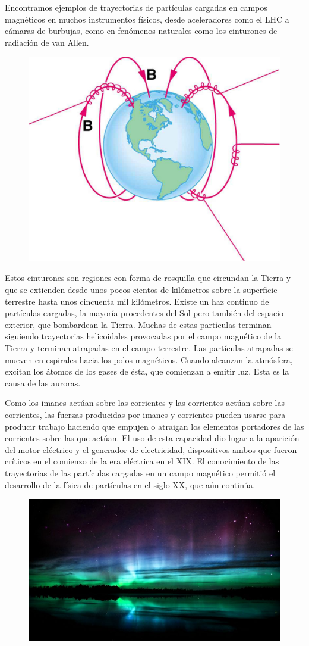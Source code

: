 \begin{multicols}{2}
\small{Encontramos ejemplos de trayectorias de partículas cargadas en campos magnéticos en muchos instrumentos físicos, desde aceleradores como el LHC a cámaras de burbujas, como en fenómenos naturales como los cinturones de radiación de van Allen.}
\begin{figure}[H]
	\centering
	\includegraphics[width=.35\textwidth]{imagenes/imagenes26/T26IM18.png}
	\end{figure}
\end{multicols}
\begin{multicols}{2}
\small{Estos cinturones son regiones con forma de rosquilla que circundan la Tierra y que se extienden desde unos pocos cientos de kilómetros sobre la superficie terrestre hasta unos cincuenta mil kilómetros. Existe un haz continuo de partículas cargadas, la mayoría procedentes del Sol pero también del espacio exterior, que bombardean la Tierra. Muchas de estas partículas terminan siguiendo trayectorias helicoidales provocadas por el campo magnético de la Tierra y terminan atrapadas en el campo terrestre. Las partículas atrapadas se mueven en espirales hacia los polos magnéticos. Cuando alcanzan la atmósfera, excitan los átomos de los gases de ésta, que comienzan a emitir luz. Esta es la causa de las auroras.}

\small{Como los imanes actúan sobre las corrientes y las corrientes actúan sobre las corrientes, las fuerzas producidas por imanes y corrientes pueden usarse para producir trabajo haciendo que empujen o atraigan los elementos portadores de las corrientes sobre las que actúan. El uso de esta capacidad dio lugar a la aparición del motor eléctrico y el generador de electricidad, dispositivos ambos que fueron críticos en el comienzo de la era eléctrica en el XIX. El conocimiento de las trayectorias de las partículas cargadas en un campo magnético permitió el desarrollo de la física de partículas en el siglo XX, que aún continúa.}
\begin{figure}[H]
	\centering
	\includegraphics[width=.4\textwidth]{imagenes/imagenes26/T26IM19.png}
	\end{figure}
\end{multicols}	

